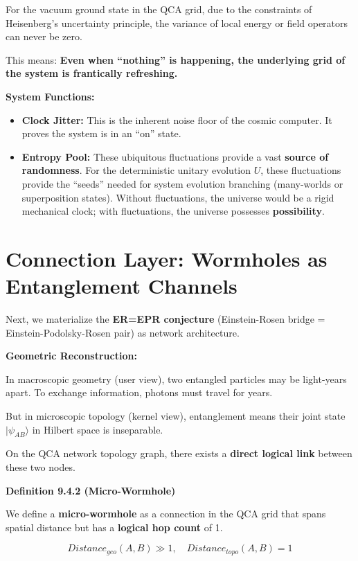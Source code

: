 \documentclass[11pt,a4paper,twoside]{book}
\begin{document}
For the vacuum ground state in the QCA grid, due to the constraints of Heisenberg's uncertainty principle, the variance of local energy or field operators can never be zero.

This means: \textbf{Even when ``nothing'' is happening, the underlying grid of the system is frantically refreshing.}

\textbf{System Functions:}

\begin{itemize}
\item \textbf{Clock Jitter:} This is the inherent noise floor of the cosmic computer. It proves the system is in an ``on'' state.

\item \textbf{Entropy Pool:} These ubiquitous fluctuations provide a vast \textbf{source of randomness}. For the deterministic unitary evolution $U$, these fluctuations provide the ``seeds'' needed for system evolution branching (many-worlds or superposition states). Without fluctuations, the universe would be a rigid mechanical clock; with fluctuations, the universe possesses \textbf{possibility}.
\end{itemize}

\section{Connection Layer: Wormholes as Entanglement Channels}

Next, we materialize the \textbf{ER=EPR conjecture} (Einstein-Rosen bridge = Einstein-Podolsky-Rosen pair) as network architecture.

\textbf{Geometric Reconstruction:}

In macroscopic geometry (user view), two entangled particles may be light-years apart. To exchange information, photons must travel for years.

But in microscopic topology (kernel view), entanglement means their joint state $|\psi_{AB}\rangle$ in Hilbert space is inseparable.

On the QCA network topology graph, there exists a \textbf{direct logical link} between these two nodes.

\textbf{Definition 9.4.2 (Micro-Wormhole)}

We define a \textbf{micro-wormhole} as a connection in the QCA grid that spans spatial distance but has a \textbf{logical hop count} of 1.

$$Distance_{geo}(A, B) \gg 1, \quad Distance_{topo}(A, B) = 1$$
\end{document}
